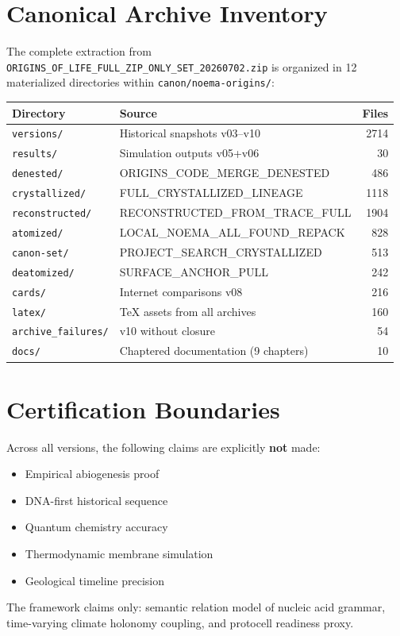 \documentclass[11pt,a4paper]{article}
\begin{document}
\appendix

\section{Canonical Archive Inventory}

The complete extraction from \texttt{ORIGINS\_OF\_LIFE\_FULL\_ZIP\_ONLY\_SET\_20260702.zip} is organized in 12 materialized directories within \texttt{canon/noema-origins/}:

\begin{longtable}{llr}
\toprule
Directory & Source & Files \\
\midrule
\texttt{versions/} & Historical snapshots v03--v10 & 2714 \\
\texttt{results/} & Simulation outputs v05+v06 & 30 \\
\texttt{denested/} & ORIGINS\_CODE\_MERGE\_DENESTED & 486 \\
\texttt{crystallized/} & FULL\_CRYSTALLIZED\_LINEAGE & 1118 \\
\texttt{reconstructed/} & RECONSTRUCTED\_FROM\_TRACE\_FULL & 1904 \\
\texttt{atomized/} & LOCAL\_NOEMA\_ALL\_FOUND\_REPACK & 828 \\
\texttt{canon-set/} & PROJECT\_SEARCH\_CRYSTALLIZED & 513 \\
\texttt{deatomized/} & SURFACE\_ANCHOR\_PULL & 242 \\
\texttt{cards/} & Internet comparisons v08 & 216 \\
\texttt{latex/} & TeX assets from all archives & 160 \\
\texttt{archive\_failures/} & v10 without closure & 54 \\
\texttt{docs/} & Chaptered documentation (9 chapters) & 10 \\
\bottomrule
\end{longtable}

\section{Certification Boundaries}

Across all versions, the following claims are explicitly \textbf{not} made:
\begin{itemize}
    \item Empirical abiogenesis proof
    \item DNA-first historical sequence
    \item Quantum chemistry accuracy
    \item Thermodynamic membrane simulation
    \item Geological timeline precision
\end{itemize}

The framework claims only: semantic relation model of nucleic acid grammar, time-varying climate holonomy coupling, and protocell readiness proxy.
\end{document}
